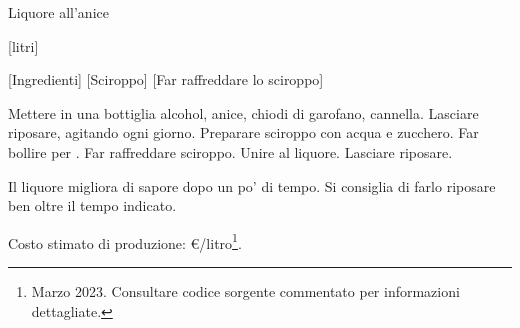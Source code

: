 \begin{recipe}{Liquore all'anice}
    \begin{header}
        [litri]
    
        [Ingredienti]
        [Sciroppo]
        [Far raffreddare lo sciroppo]
    \end{header}

    \begin{ingredients}
    \end{ingredients}
    
    \begin{preparation}
        \step Mettere in una bottiglia alcohol, anice, chiodi di garofano, cannella.
        \step Lasciare riposare, agitando ogni giorno.
        \step Preparare sciroppo con acqua e zucchero.
        \step Far bollire per .
        \step Far raffreddare sciroppo.
        \step Unire al liquore.
        \step Lasciare riposare.
    \end{preparation}
    
    \begin{suggestion}
        \suggestionMark Il liquore migliora di sapore dopo un po' di tempo. Si consiglia di farlo riposare ben oltre il tempo indicato.
        
        \suggestionMark Costo stimato di produzione: €/litro\footnote{
            Marzo 2023.
            Consultare codice sorgente commentato per informazioni dettagliate.
        }.
    \end{suggestion}
\end{recipe}
